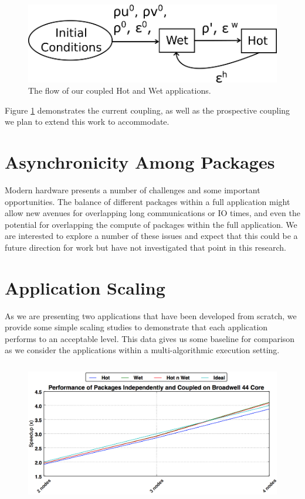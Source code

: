 \documentclass[runningheads,a4paper]{llncs}
\begin{document}
\begin{figure}
\centering
\includegraphics[width=1.0\linewidth]{hot-wet-flow}
\caption{The flow of our coupled Hot and Wet applications.}
\label{fig:hot-wet-flow}
\end{figure}

Figure \ref{fig:hot-wet-flow} demonstrates the current coupling, as well as the prospective coupling we plan to extend this work to accommodate. 

\section{Asynchronicity Among Packages}

Modern hardware presents a number of challenges and some important opportunities. The balance of different packages within a full application might allow new avenues for overlapping long communications or IO times, and even the potential for overlapping the compute of packages within the full application. We are interested to explore a number of these issues and expect that this could be a future direction for work but have not investigated that point in this research.

\section{Application Scaling}

As we are presenting two applications that have been developed from scratch, we provide some simple scaling studies to demonstrate that each application performs to an acceptable level. This data gives us some baseline for comparison as we consider the applications within a multi-algorithmic execution setting.

\begin{figure}
\centering
\includegraphics[height=6.2cm]{cpu_results}
\caption{}
\label{fig:example}
\end{figure}
\end{document}
